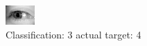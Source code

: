 \begin{figure}[h!]
\begin{center}
\includegraphics[width=0.60\columnwidth]{figures/ID3227_class_3_target_4.png}
\end{center}
\caption{ Classification: 3 actual target: 4}
\label{fig:ID3227_class_3_target_4}
\end{figure}
